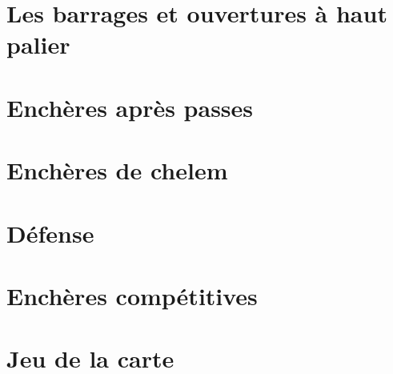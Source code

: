 \documentclass[a4paper]{article}
\begin{document}
\section{Les barrages et ouvertures à haut palier}

\section{Enchères après passes}

\section{Enchères de chelem}

\section{Défense}

\section{Enchères compétitives}

\section{Jeu de la carte}
\end{document}
